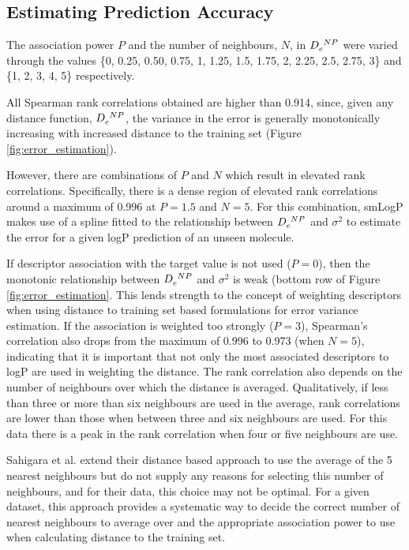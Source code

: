 \documentclass[10pt]{bmc_article}
\newenvironment{bmcformat}{\begin{raggedright}\baselineskip20pt\sloppy\setboolean{publ}{false}}{\end{raggedright}\baselineskip20pt\sloppy}
\begin{document}
\begin{bmcformat}
\subsection*{Estimating Prediction Accuracy}

The association power $P$ and the number of neighbours, $N$, in $\tensor{D}{_e^N^P}$ were varied through the values \{0, 0.25, 0.50, 0.75, 1, 1.25, 1.5, 1.75, 2, 2.25, 2.5, 2.75, 3\} and \{1, 2, 3, 4, 5\} respectively. 

All Spearman rank correlations obtained are higher than 0.914, since, given any distance function, $\tensor{D}{_e^N^P}$, the variance in the error is generally monotonically increasing with increased distance to the training set (Figure \ref{fig:error_estimation}). 

However, there are combinations of $P$ and $N$ which result in elevated rank correlations. Specifically, there is a dense region of elevated rank correlations around a maximum of 0.996 at $P=1.5$ and $N=5$. For this combination, smLogP makes use of a spline fitted to the relationship between $\tensor{D}{_e^N^P}$ and $\sigma^2$ to estimate the error for a given logP prediction of an unseen molecule.

If descriptor association with the target value is not used ($P=0$), then the monotonic relationship between $\tensor{D}{_e^N^P}$ and $\sigma^2$ is weak (bottom row of Figure \ref{fig:error_estimation}. This lends strength to the concept of weighting descriptors when using distance to training set based formulations for error variance estimation. If the association is weighted too strongly ($P=3$), Spearman's correlation also drops from the maximum of 0.996 to 0.973 (when $N=5$), indicating that it is important that not only the most associated descriptors to logP are used in weighting the distance. The rank correlation also depends on the number of neighbours over which the distance is averaged. Qualitatively, if less than three or more than six neighbours are used in the average, rank correlations are lower than those when between three and six neighbours are used. For this data there is a peak in the rank correlation when four or five neighbours are use. 

Sahigara et al. \cite{sahigara_comparison_2012} extend their distance based approach to use the average of the 5 nearest neighbours but do not supply any reasons for selecting this number of neighbours, and for their data, this choice may not be optimal. For a given dataset, this approach provides a systematic way to decide the correct number of nearest neighbours to average over and the appropriate association power to use when calculating distance to the training set.


\end{bmcformat}
\end{document}
